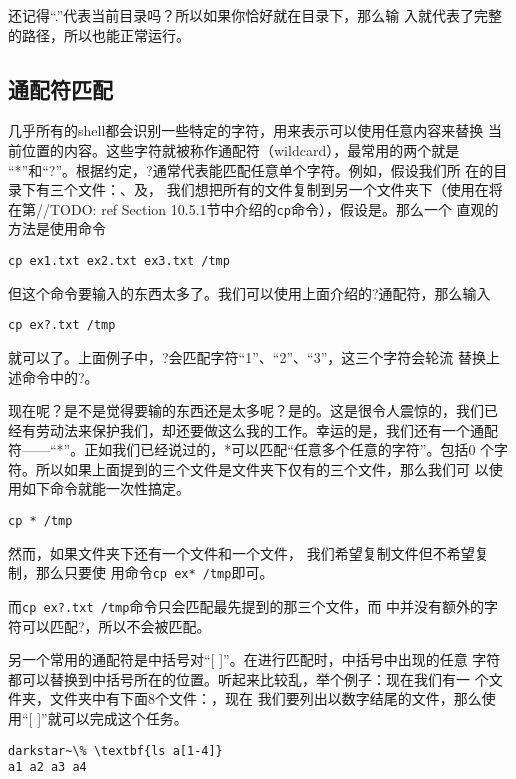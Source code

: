 还记得``.''代表当前目录吗？所以如果你恰好就在目录下，那么输
入就代表了完整的路径，所以也能正常运行。

\subsection{通配符匹配}
\label{sec:shell:commandLine:wildcard}
几乎所有的shell都会识别一些特定的字符，用来表示可以使用任意内容来替换
当前位置的内容。这些字符就被称作通配符（wildcard），最常用的两个就是
``*''和``?''。根据约定，?通常代表能匹配任意单个字符。例如，假设我们所
在的目录下有三个文件：、及，
我们想把所有的文件复制到另一个文件夹下（使用在将在第//TODO: ref
Section 10.5.1节中介绍的\texttt{cp}命令），假设是。那么一个
直观的方法是使用命令
\begin{verbatim}
cp ex1.txt ex2.txt ex3.txt /tmp
\end{verbatim}
但这个命令要输入的东西太多了。我们可以使用上面介绍的?通配符，那么输入
\begin{verbatim}
cp ex?.txt /tmp
\end{verbatim}
就可以了。上面例子中，?会匹配字符``1''、``2''、``3''，这三个字符会轮流
替换上述命令中的?。

现在呢？是不是觉得要输的东西还是太多呢？是的。这是很令人震惊的，我们已
经有劳动法来保护我们，却还要做这么我的工作。幸运的是，我们还有一个通配
符——``*''。正如我们已经说过的，*可以匹配``任意多个任意的字符''。包括0
个字符。所以如果上面提到的三个文件是文件夹下仅有的三个文件，那么我们可
以使用如下命令就能一次性搞定。
\begin{verbatim}
cp * /tmp
\end{verbatim}
然而，如果文件夹下还有一个文件和一个文件，
我们希望复制文件但不希望复制，那么只要使
用命令\verb|cp ex* /tmp|即可。

而\verb|cp ex?.txt /tmp|命令只会匹配最先提到的那三个文件，而
中并没有额外的字符可以匹配?，所以不会被匹配。

另一个常用的通配符是中括号对``[ ]''。在进行匹配时，中括号中出现的任意
字符都可以替换到中括号所在的位置。听起来比较乱，举个例子：现在我们有一
个文件夹，文件夹中有下面8个文件：，现在
我们要列出以数字结尾的文件，那么使用``[ ]''就可以完成这个任务。
\begin{Verbatim}[frame=single, commandchars=\\\{\}]
darkstar~\% \textbf{ls a[1-4]}
a1 a2 a3 a4
\end{Verbatim}

